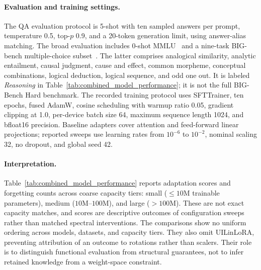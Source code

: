 \paragraph{Evaluation and training settings.}
The QA evaluation protocol is 5-shot with ten sampled answers per prompt, temperature 0.5, top-$p$ 0.9, and a 20-token generation limit, using answer-alias matching. The broad evaluation includes 0-shot MMLU~\citep{hendrycks2020measuring} and a nine-task BIG-bench multiple-choice subset~\citep{srivastava2023beyond}. The latter comprises analogical similarity, analytic entailment, causal judgment, cause and effect, common morpheme, conceptual combinations, logical deduction, logical sequence, and odd one out. It is labeled \emph{Reasoning} in Table~\ref{tab:combined_model_performance}; it is not the full BIG-Bench Hard benchmark. The recorded training protocol uses SFTTrainer, ten epochs, fused AdamW, cosine scheduling with warmup ratio 0.05, gradient clipping at 1.0, per-device batch size 64, maximum sequence length 1024, and bfloat16 precision. Baseline adapters cover attention and feed-forward linear projections; reported sweeps use learning rates from $10^{-6}$ to $10^{-2}$, nominal scaling 32, no dropout, and global seed 42.

\paragraph{Interpretation.}
Table~\ref{tab:combined_model_performance} reports adaptation scores and forgetting counts across coarse capacity tiers: small ($\le10$M trainable parameters), medium ($10$M--$100$M), and large ($>100$M). These are not exact capacity matches, and scores are descriptive outcomes of configuration sweeps rather than matched spectral interventions. The comparisons show no uniform ordering across models, datasets, and capacity tiers. They also omit UILinLoRA, preventing attribution of an outcome to rotations rather than scalers. Their role is to distinguish functional evaluation from structural guarantees, not to infer retained knowledge from a weight-space constraint.


